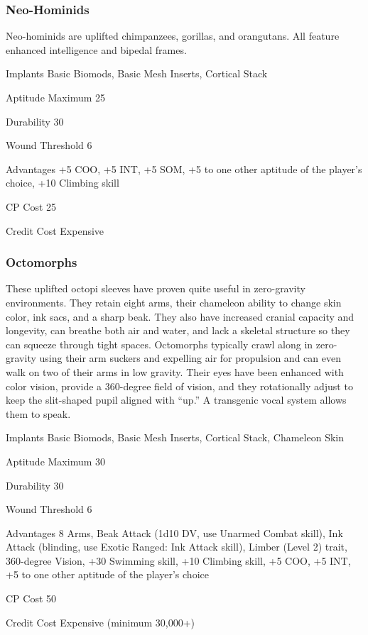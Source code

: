 \subsubsection{Neo-Hominids}
Neo-hominids are uplifted chimpanzees, gorillas, and orangutans. All feature
enhanced intelligence and bipedal frames.

\begin{description*}
\item[Implants] Basic Biomods, Basic Mesh Inserts, Cortical Stack 
\item[Aptitude Maximum] 25 
\item[Durability] 30 
\item[Wound Threshold] 6 
\item[Advantages] +5 COO, +5 INT, +5 SOM, +5 to one other aptitude of the
  player’s choice, +10 Climbing skill
\item[CP Cost] 25 
\item[Credit Cost] Expensive 
\end{description*}

\subsubsection{Octomorphs}
These uplifted octopi sleeves have proven quite useful in zero-gravity
environments. They retain eight arms, their chameleon ability to change skin
color, ink sacs, and a sharp beak. They also have increased cranial capacity
and longevity, can breathe both air and water, and lack a skeletal structure so
they can squeeze through tight spaces. Octomorphs typically crawl along in
zero-gravity using their arm suckers and expelling air for propulsion and can
even walk on two of their arms in low gravity. Their eyes have been enhanced
with color vision, provide a 360-degree field of vision, and they rotationally
adjust to keep the slit-shaped pupil aligned with “up.” A transgenic vocal
system allows them to speak.

\begin{description*}
\item[Implants] Basic Biomods, Basic Mesh Inserts, Cortical Stack, Chameleon
  Skin
\item[Aptitude Maximum] 30 
\item[Durability] 30 
\item[Wound Threshold] 6 
\item[Advantages] 8 Arms, Beak Attack (1d10 DV, use Unarmed Combat skill), Ink
  Attack (blinding, use Exotic Ranged: Ink Attack skill), Limber (Level 2)
  trait, 360-degree Vision, +30 Swimming skill, +10 Climbing skill, +5 COO, +5
  INT, +5 to one other aptitude of the player’s choice
\item[CP Cost] 50 
\item[Credit Cost] Expensive (minimum 30,000+) 
\end{description*}

